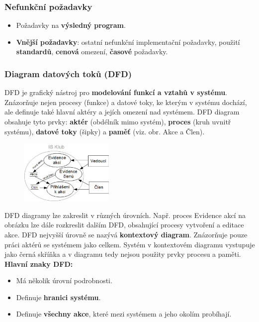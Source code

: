 \subsubsection*{Nefunkční požadavky}
\begin{itemize}
\item Požadavky na \textbf{výsledný program}.
\item \textbf{Vnější požadavky}: ostatní nefunkční implementační požadavky, použití \textbf{standardů}, \textbf{cenová} omezení, \textbf{časové} požadavky.
\end{itemize}

\subsubsection{Diagram datových toků (DFD)}
DFD je grafický nástroj pro \textbf{modelování funkcí a vztahů v systému}. Znázorňuje nejen procesy (funkce) a datové toky, ke kterým v systému dochází, ale definuje také hlavní aktéry a jejích omezení nad systémem. DFD diagram obsahuje tyto prvky: \textbf{aktér} (obdélník mimo systém), \textbf{proces} (kruh uvnitř systému), \textbf{datové toky} (šipky) a \textbf{paměť} (viz. obr. Akce a Člen).

\begin{figure}[H]
	\centering
	\includegraphics[width=0.4\textwidth]{assets/dfd.png}
\end{figure}

DFD diagramy lze zakreslit v různých úrovních. Např. proces Evidence akcí na obrázku lze dále rozkreslit dalším DFD, obsahující procesy vytvoření a editace akce. DFD nejvyšší úrovně se nazývá \textbf{kontextový diagram}. Znázorňuje pouze práci aktérů se systémem jako celkem. Systém v kontextovém diagramu vystupuje jako černá skříňka a v diagramu tedy nejsou použity prvky procesu a paměti.
\textbf{Hlavní znaky DFD:}

\begin{itemize}
\item Má několik úrovní podrobnosti.
\item Definuje \textbf{hranici systému}.
\item Definuje \textbf{všechny akce}, které mezi systémem a jeho okolím probíhají.
\end{itemize}

